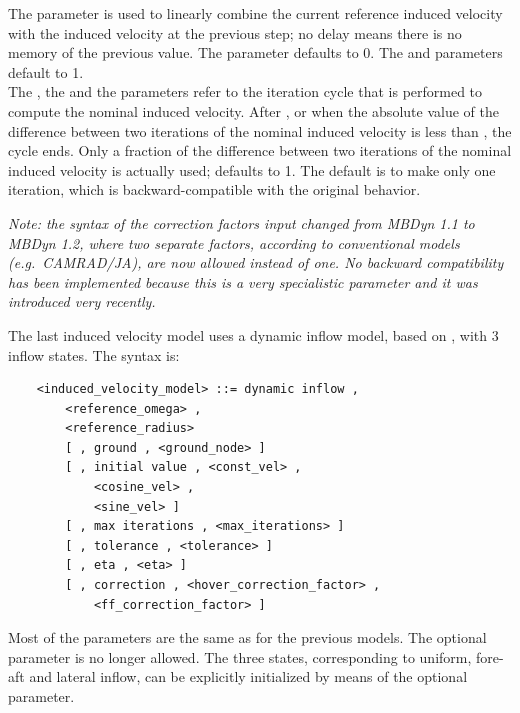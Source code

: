 The  parameter is used to linearly combine the current
reference induced velocity with the induced velocity at the previous step;
no delay means there is no memory of the previous value.
The  parameter defaults to 0.
The  
and  parameters default to 1. \\
The , the  
and the  parameters refer to the iteration cycle 
that is performed to compute the nominal induced velocity.
After , or when the absolute value 
of the difference between two iterations of the nominal induced 
velocity is less than , the cycle ends.
Only a fraction  of the difference between two
iterations of the nominal induced velocity is actually
used;  defaults to 1.
The default is to make only one iteration, which is backward-compatible
with the original behavior.

\emph{
	Note: the syntax of the correction factors input changed
	from MBDyn 1.1 to MBDyn 1.2, where two separate factors,
	according to conventional models (e.g.\ CAMRAD/JA), 
	are now allowed instead of one.
	No backward compatibility has been implemented because 
	this is a very specialistic parameter and it was introduced 
	very recently.
}

The last induced velocity model uses a dynamic inflow model,
based on \cite{PITT}, with 3 inflow states.
The syntax is:
\begin{verbatim}
    <induced_velocity_model> ::= dynamic inflow , 
        <reference_omega> , 
        <reference_radius> 
        [ , ground , <ground_node> ]
        [ , initial value , <const_vel> ,
            <cosine_vel> ,
            <sine_vel> ]
        [ , max iterations , <max_iterations> ]
        [ , tolerance , <tolerance> ]
        [ , eta , <eta> ]
        [ , correction , <hover_correction_factor> ,
            <ff_correction_factor> ]
\end{verbatim}
Most of the parameters are the same as for the previous models.
The optional  parameter is no longer allowed.
The three states, corresponding to uniform, fore-aft and lateral inflow,
can be explicitly initialized by means of the optional 
 parameter.

